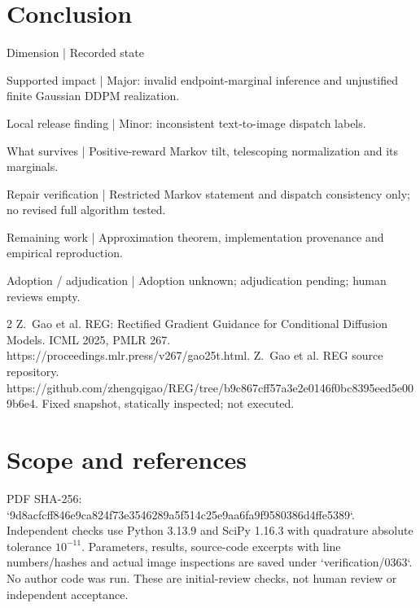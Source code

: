 \documentclass[10pt]{article}
\begin{document}
\section*{Conclusion}
Dimension | Recorded state\par
Supported impact | Major: invalid endpoint-marginal inference and unjustified finite Gaussian DDPM realization.\par
Local release finding | Minor: inconsistent text-to-image dispatch labels.\par
What survives | Positive-reward Markov tilt, telescoping normalization and its marginals.\par
Repair verification | Restricted Markov statement and dispatch consistency only; no revised full algorithm tested.\par
Remaining work | Approximation theorem, implementation provenance and empirical reproduction.\par
Adoption / adjudication | Adoption unknown; adjudication pending; human reviews empty.\par
2 Z. Gao et al. REG: Rectified Gradient Guidance for Conditional Diffusion Models. ICML 2025, PMLR 267. https://proceedings.mlr.press/v267/gao25t.html. Z. Gao et al. REG source repository. https://github.com/zhengqigao/REG/tree/b9c867cff57a3e2e0146f0bc8395eed5e009b6e4. Fixed snapshot, statically inspected; not executed.\par
\section*{Scope and references}
PDF SHA-256: `9d8acfcff846e9ca824f73e3546289a5f514c25e9aa6fa9f9580386d4ffe5389`. Independent checks use Python 3.13.9 and SciPy 1.16.3 with quadrature absolute tolerance \(10^{-11}\). Parameters, results, source-code excerpts with line numbers/hashes and actual image inspections are saved under `verification/0363`. No author code was run. These are initial-review checks, not human review or independent acceptance.\par
\end{document}
